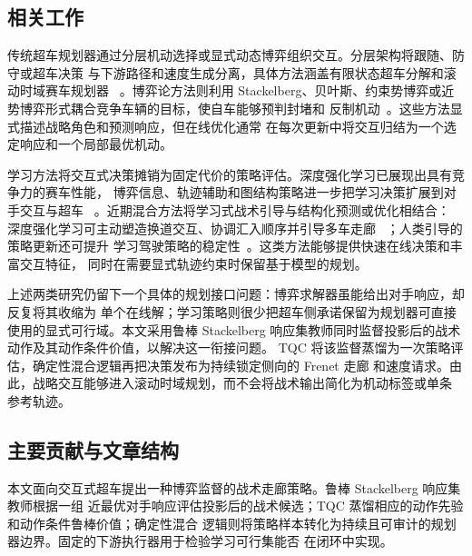 \documentclass[final,5p,twocolumn]{elsarticle}
\begin{document}
\subsection{相关工作}

传统超车规划器通过分层机动选择或显式动态博弈组织交互。分层架构将跟随、防守或超车决策
与下游路径和速度生成分离，具体方法涵盖有限状态超车分解和滚动时域赛车规划器
~\cite{sureshbabu2022autopass,kim2023hierarchical,jung2023iac,
thakkar2024hierarchical,toschi2025modular,hoffmann2026a2rl}。博弈论方法则利用
Stackelberg、贝叶斯、约束势博弈或近势博弈形式耦合竞争车辆的目标，使自车能够预判封堵和
反制机动~\cite{ji2023hierarchicalgame,jia2023bayesian,kalaria2025alpha,
lopez2022payoff,swain2023cooperative}。这些方法显式描述战略角色和预测响应，但在线优化通常
在每次更新中将交互归结为一个选定响应和一个局部最优机动。

学习方法将交互式决策摊销为固定代价的策略评估。深度强化学习已展现出具有竞争力的赛车性能，
博弈信息、轨迹辅助和图结构策略进一步把学习决策扩展到对手交互与超车
~\cite{wurman2022gtsophy,yuan2022drlgame,lin2023limit,
evans2023trajectory,hell2024lidar,hu2023dynamicgraph,
baumann2025predictive,han2024marl}。近期混合方法将学习式战术引导与结构化预测或优化相结合：
深度强化学习可主动塑造换道交互、协调汇入顺序并引导多车走廊
~\cite{liu2023proactive,muzahid2025merging,yang2026corridor}；人类引导的策略更新还可提升
学习驾驶策略的稳定性~\cite{guo2025rlhf}。这类方法能够提供快速在线决策和丰富交互特征，
同时在需要显式轨迹约束时保留基于模型的规划。

上述两类研究仍留下一个具体的规划接口问题：博弈求解器虽能给出对手响应，却反复将其收缩为
单个在线解；学习策略则很少把超车侧承诺保留为规划器可直接使用的显式可行域。本文采用鲁棒
Stackelberg 响应集教师同时监督投影后的战术动作及其动作条件价值，以解决这一衔接问题。
TQC 将该监督蒸馏为一次策略评估，确定性混合逻辑再把决策发布为持续锁定侧向的 Frenet 走廊
和速度请求。由此，战略交互能够进入滚动时域规划，而不会将战术输出简化为机动标签或单条
参考轨迹。

\subsection{主要贡献与文章结构}

本文面向交互式超车提出一种博弈监督的战术走廊策略。鲁棒 Stackelberg 响应集教师根据一组
近最优对手响应评估投影后的战术候选；TQC 蒸馏相应的动作先验和动作条件鲁棒价值；确定性混合
逻辑则将策略样本转化为持续且可审计的规划器边界。固定的下游执行器用于检验学习可行集能否
在闭环中实现。
\end{document}
